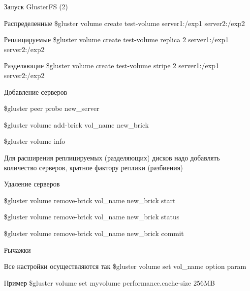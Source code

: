 \documentclass{beamer}
\begin{document}
\begin{frame}{Запуск GlusterFS (2)}
	\begin{block}{Распределенные}
		\$gluster volume create test-volume server1:/exp1 server2:/exp2
	\end{block}
	\begin{block}{Реплицируемые}
		\$gluster volume create test-volume replica 2 server1:/exp1 server2:/exp2
	\end{block}
	\begin{block}{Разделяющие}
		\$gluster volume create test-volume stripe 2 server1:/exp1 server2:/exp2
	\end{block}
\end{frame}

\begin{frame}{Добавление серверов}
	\begin{block}{} 
		\$gluster peer probe new\_server

		\pause
		\$gluster volume add-brick vol\_name new\_brick

		\pause
		\$gluster volume info
	\end{block}
	\pause
	\vspace{1cm}
	Для расширения реплицируемых (разделяющих) дисков надо добавлять количество серверов, кратное фактору реплики (разбиения)
\end{frame}

\begin{frame}{Удаление серверов}
	\begin{block}{} 
		\$gluster volume remove-brick vol\_name new\_brick start

		\pause
		\$gluster volume remove-brick vol\_name new\_brick status

		\pause
		\$gluster volume remove-brick vol\_name new\_brick commit
	\end{block}
\end{frame}

\begin{frame}{Рычажки}
	\begin{block}{Все настройки осуществляются так}
		 \$gluster volume set vol\_name option param	
	\end{block}
	\begin{block}{Пример}
		 \$gluster volume set myvolume performance.cache-size 256MB	
	\end{block}
\end{frame}
\end{document}

